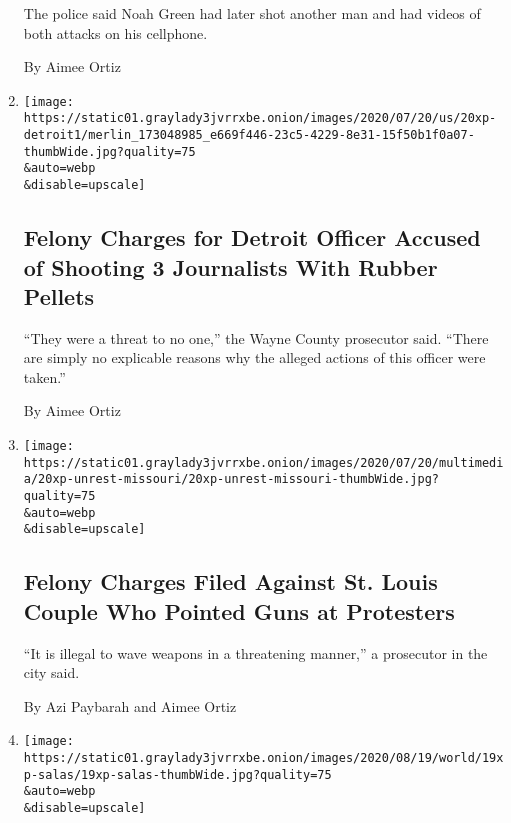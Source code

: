 \begin{enumerate}
  The police said Noah Green had later shot another man and had videos
  of both attacks on his cellphone.

  By Aimee Ortiz
\item
  \href{/2020/07/21/us/detroit-police-shooting-journalists.html}{}

  \texttt{[image: https://static01.graylady3jvrrxbe.onion/images/2020/07/20/us/20xp-detroit1/merlin\_173048985\_e669f446-23c5-4229-8e31-15f50b1f0a07-thumbWide.jpg?quality=75\\\&auto=webp\\\&disable=upscale]}

  \hypertarget{felony-charges-for-detroit-officer-accused-of-shooting-3-journalists-with-rubber-pellets}{%
  \subsection{Felony Charges for Detroit Officer Accused of Shooting 3
  Journalists With Rubber
  Pellets}\label{felony-charges-for-detroit-officer-accused-of-shooting-3-journalists-with-rubber-pellets}}

  ``They were a threat to no one,'' the Wayne County prosecutor said.
  ``There are simply no explicable reasons why the alleged actions of
  this officer were taken.''

  By Aimee Ortiz
\item
  \href{/2020/07/20/us/mark-patricia-mccloskey-charges.html}{}

  \texttt{[image: https://static01.graylady3jvrrxbe.onion/images/2020/07/20/multimedia/20xp-unrest-missouri/20xp-unrest-missouri-thumbWide.jpg?quality=75\\\&auto=webp\\\&disable=upscale]}

  \hypertarget{felony-charges-filed-against-st-louis-couple-who-pointed-guns-at-protesters}{%
  \subsection{Felony Charges Filed Against St. Louis Couple Who Pointed
  Guns at
  Protesters}\label{felony-charges-filed-against-st-louis-couple-who-pointed-guns-at-protesters}}

  ``It is illegal to wave weapons in a threatening manner,'' a
  prosecutor in the city said.

  By Azi Paybarah and Aimee Ortiz
\item
  \href{/2020/07/19/nyregion/shooting-nj-judge-esther-salas.html}{}

  \texttt{[image: https://static01.graylady3jvrrxbe.onion/images/2020/08/19/world/19xp-salas/19xp-salas-thumbWide.jpg?quality=75\\\&auto=webp\\\&disable=upscale]}


\end{enumerate}
